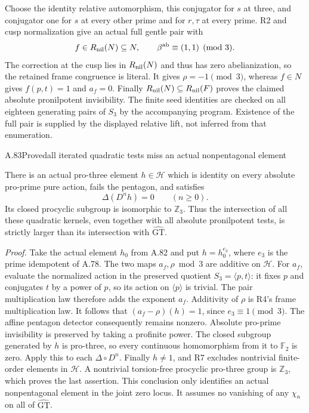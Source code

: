 Choose the identity relative automorphism, this conjugator
for $s$ at three, and conjugator one for $s$ at every other
prime and for $r,\tau$ at every prime. R2 and cusp normalization
give an actual full gentle pair with
\[
 f\in R_{\rm nil}(N)\subseteq N,\qquad
 \beta^{\rm ab}\equiv(1,1)\pmod3.
\]
The correction at the cusp lies in $R_{\rm nil}(N)$ and thus
has zero abelianization, so the retained frame congruence is
literal. It gives $\rho=-1\pmod3$, whereas $f\in N$ gives
$f(p,t)=1$ and $a_f=0$. Finally
$R_{\rm nil}(N)\subseteq R_{\rm nil}(F)$ proves the claimed
absolute pronilpotent invisibility. The finite seed identities
are checked on all eighteen generating pairs of $S_3$ by the
accompanying program. Existence of the full pair is supplied
by the displayed relative lift, not inferred from that enumeration.

\begin{statement}{A.83}{Proved}{all iterated quadratic tests miss an actual nonpentagonal element}
\end{statement}
There is an actual pro-three element $h\in\mathcal H$ which is
identity on every absolute pro-prime pure action, fails the pentagon,
and satisfies
\[
                   \Delta(D^n h)=0\qquad(n\geq0).
\]
Its closed procyclic subgroup is isomorphic to $\mathbb Z_3$.
Thus the intersection of all these quadratic kernels, even together
with all absolute pronilpotent tests, is strictly larger than its
intersection with $\widehat{\mathrm{GT}}$.

\emph{Proof.}
Take the actual element $h_0$ from A.82 and put
$h=h_0^{e_3}$, where $e_3$ is the prime idempotent of A.78.
The two maps $a_f,\rho\bmod3$ are additive on $\mathcal H$.
For $a_f$, evaluate the normalized action in the preserved quotient
$S_3=\langle p,t\rangle$: it fixes $p$ and conjugates $t$
by a power of $p$, so its action on $\langle p\rangle$ is trivial.
The pair multiplication law therefore adds the exponent $a_f$.
Additivity of $\rho$ is R4's frame multiplication law.
It follows that $(a_f-\rho)(h)=1$, since $e_3\equiv1\pmod3$.
The affine pentagon detector consequently remains nonzero.
Absolute pro-prime invisibility is preserved by taking a profinite
power. The closed subgroup generated by $h$ is pro-three, so every
continuous homomorphism from it to $\mathbb F_2$ is zero.
Apply this to each $\Delta\circ D^n$.
Finally $h\ne1$, and R7 excludes nontrivial finite-order elements
in $\mathcal H$. A nontrivial torsion-free procyclic pro-three
group is $\mathbb Z_3$, which proves the last assertion.
This conclusion only identifies an actual nonpentagonal element
in the joint zero locus. It assumes no vanishing of any
$\chi_n$ on all of $\widehat{\mathrm{GT}}$.

